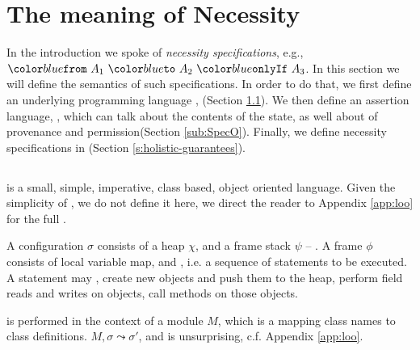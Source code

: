\section{The meaning of Necessity}
\label{s:semantics}

In the introduction we spoke of \emph{necessity specifications}, e.g., $\onlyIf {A_1} {A_2} {A_3}$. 
In this section we will define the semantics of such specifications.
In order to do that, we first define 
an underlying programming language \Loo, (Section \ref{sub:Loo}).
We then  define an assertion language, \SpecO,  which can talk about
 the contents of the state, as well about 
  of provenance and permission(Section \ref{sub:SpecO}).
Finally, we define necessity specifications in \SpecO (Section \ref{s:holistic-guarantees}).
\sophia[added]{} 



\subsection{\Loo}
\label{sub:Loo} 
 \Loo is a small, simple, imperative,
class based, object oriented language. 
Given the simplicity of \Loo, we do not
define it here,  we direct the reader to Appendix \ref{app:loo} for 
the full . %

A \Loo configuration $\sigma$ consists of a 
heap $\chi$, and a frame stack $\psi$ --
.    
A frame $\phi$ consists of
local variable map, and , i.e. a sequence of statements to be executed.
 A statement may , create new objects and push them to the heap, 
perform field reads and writes on objects,  
 call methods on those objects. 

 is performed in the context of a module $M$,
which is a mapping
 class names to class definitions. 
  $M, \sigma \leadsto \sigma'$, and is
unsurprising,  c.f. Appendix \ref{app:loo}.
 
